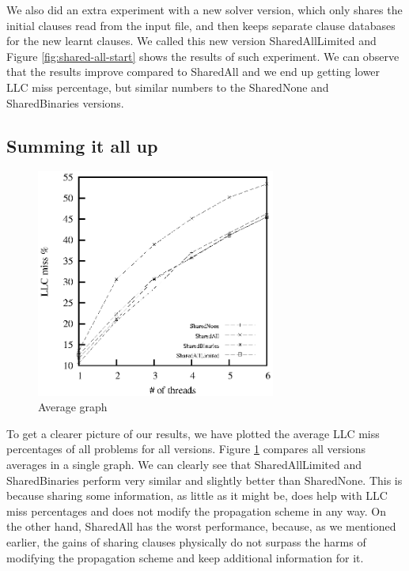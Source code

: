 \documentclass[12pt]{diicc}
\begin{document}
We also did an extra experiment with a new solver version, which only shares the initial clauses read from the input file, and then keeps separate clause databases for the new learnt clauses. We called this new version SharedAllLimited and Figure \ref{fig:shared-all-start} shows the results of such experiment. We can observe that the results improve compared to SharedAll and we end up getting lower LLC miss percentage, but similar numbers to the SharedNone and SharedBinaries versions.

\subsection{Summing it all up}

\begin{figure}[h!]
	\centering
		\includegraphics[width=0.7\textwidth]{average}
	\caption{Average graph}
	\label{fig:average}
\end{figure}

To get a clearer picture of our results, we have plotted the average LLC miss percentages of all problems for all versions. Figure \ref{fig:average} compares all versions averages in a single graph. We can clearly see that SharedAllLimited and SharedBinaries perform very similar and slightly better than SharedNone. This is because sharing some information, as little as it might be, does help with LLC miss percentages and does not modify the propagation scheme in any way. On the other hand, SharedAll has the worst performance, because, as we mentioned earlier, the gains of sharing clauses physically do not surpass the harms of modifying the propagation scheme and keep additional information for it.
\end{document}

